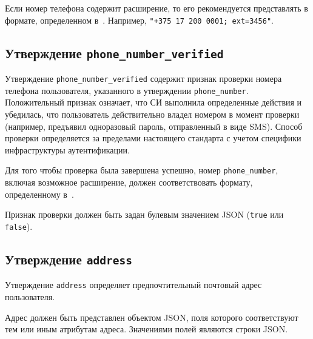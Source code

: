 Если номер телефона содержит расширение, то его рекомендуется
представлять в формате, определенном в~\cite{RFC3966}.
%
Например, \lstinline{"+375 17 200 0001; ext=3456"}.
%

\subsection{Утверждение \lstinline{phone_number_verified}}
\label{CLAIMS.PhoneNumberVerified}

Утверждение \lstinline{phone_number_verified} содержит признак проверки номера
телефона пользователя, указанного в утверждении \lstinline{phone_number}. 
%
Положительный признак означает, что СИ выполнила определенные действия и
убедилась, что пользователь действительно владел номером в момент проверки
(например, предъявил одноразовый пароль, отправленный в виде SMS).
%
Способ проверки определяется за пределами настоящего стандарта с учетом 
специфики инфраструктуры аутентификации.  

Для того чтобы проверка была завершена успешно, номер \lstinline{phone_number}, 
включая возможное расширение, должен соответствовать формату, определенному 
в~\cite{E-164,RFC3966}.  

Признак проверки должен быть задан булевым значением JSON
(\lstinline{true} или \lstinline{false}). 

\subsection{Утверждение \lstinline{address}}\label{CLAIMS.Address}

Утверждение \lstinline{address} определяет предпочтительный почтовый адрес пользователя. 

Адрес должен быть представлен объектом JSON, поля которого соответствуют тем 
или иным атрибутам адреса. Значениями полей являются строки JSON.

